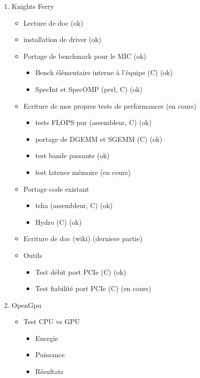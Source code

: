 \documentclass{article}
\begin{document}
			\begin{enumerate}
			\item Knights Ferry
				\begin{itemize}
				\item Lecture de doc (ok)
				\item installation de driver (ok)
				\item Portage de benchmark pour le MIC (ok)
					\begin{itemize}
					\item Bench élémentaire interne à l'équipe (C) (ok)
					\item SpecInt et SpecOMP (perl, C) (ok)
					\end{itemize}
				\item Ecriture de mes propres tests de performances (en cours)
					\begin{itemize}
					\item tests FLOPS pur (assembleur, C) (ok)
					\item portage de DGEMM et SGEMM (C) (ok)
					\item test bande passante (ok)
					\item test latence mémoire (en cours)
					\end{itemize}
				\item Portage code existant
					\begin{itemize}
					\item tsha (assembleur, C) (ok)
					\item Hydro (C) (ok)
					\end{itemize}
				\item Ecriture de doc (wiki) (derniere partie)
				\item Outils
					\begin{itemize}
					\item Test débit port PCIe (C) (ok)
					\item Test fiabilité port PCIe (C) (en cours)
					\end{itemize}
				\end{itemize}
			\item OpenGpu
				\begin{itemize}
				\item Test CPU vs GPU
					\begin{itemize}
					\item Energie
					\item Puissance
					\item Résultats
					\end{itemize}
				\end{itemize}

\end{enumerate}
\end{document}
